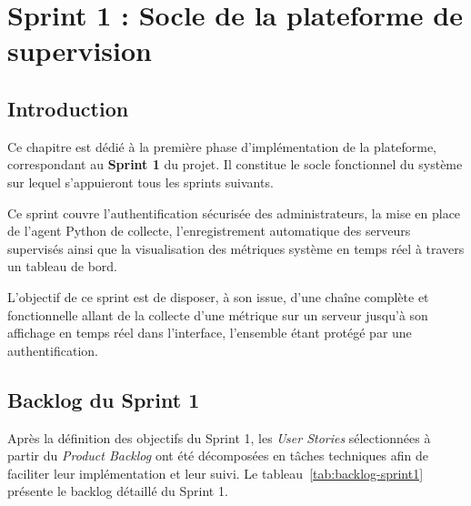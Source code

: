 \thispagestyle{fancy}

\chapter{Sprint 1 : Socle de la plateforme de supervision}

\section*{Introduction}
Ce chapitre est dédié à la première phase d'implémentation de la plateforme,
correspondant au \textbf{Sprint 1} du projet. Il constitue le socle fonctionnel du
système sur lequel s'appuieront tous les sprints suivants.

Ce sprint couvre l'authentification sécurisée des administrateurs, la mise en place de
l'agent Python de collecte, l'enregistrement automatique des serveurs supervisés ainsi
que la visualisation des métriques système en temps réel à travers un tableau de bord.

L'objectif de ce sprint est de disposer, à son issue, d'une chaîne complète et
fonctionnelle allant de la collecte d'une métrique sur un serveur jusqu'à son affichage
en temps réel dans l'interface, l'ensemble étant protégé par une authentification.

\section{Backlog du Sprint 1}
Après la définition des objectifs du Sprint 1, les \textit{User Stories} sélectionnées
à partir du \textit{Product Backlog} ont été décomposées en tâches techniques afin de
faciliter leur implémentation et leur suivi. Le tableau~\ref{tab:backlog-sprint1}
présente le backlog détaillé du Sprint 1.

